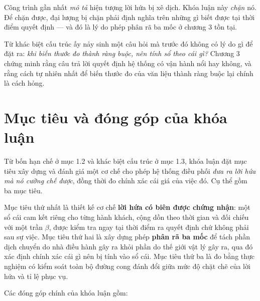\begin{khungy}
Công trình gần nhất \emph{mô tả} hiện tượng lời hứa bị xê dịch. Khóa luận này \emph{chặn} nó.
Để chặn được, đại lượng bị chặn phải định nghĩa trên những gì biết được tại thời điểm quyết
định --- và đó là lý do phép phân rã ba mốc ở chương 3 tồn tại.
\end{khungy}

Từ khác biệt cấu trúc ấy nảy sinh một câu hỏi mà trước đó không có lý do gì để đặt ra:
\emph{khi biến thước đo thành ràng buộc, nên tính sổ theo cái gì?} Chương 3 chứng minh rằng câu
trả lời quyết định hệ thống có vận hành nổi hay không, và rằng cách tự nhiên nhất để biến thước
đo của văn liệu thành ràng buộc lại chính là cách hỏng.

\section{Mục tiêu và đóng góp của khóa luận}

Từ bốn hạn chế ở mục 1.2 và khác biệt cấu trúc ở mục 1.3, khóa luận đặt mục tiêu xây dựng và
đánh giá một cơ chế cho phép hệ thống điều phối \emph{đưa ra lời hứa mà nó cưỡng chế được},
đồng thời đo chính xác cái giá của việc đó. Cụ thể gồm ba mục tiêu.

Mục tiêu thứ nhất là thiết kế cơ chế \textbf{lời hứa có biên được chứng nhận}: một sổ cái cam
kết riêng cho từng hành khách, cộng dồn theo thời gian và đối chiếu với một trần $\beta$, được
kiểm tra ngay tại thời điểm ra quyết định chứ không phải sau sự việc. Mục tiêu thứ hai là xây
dựng phép \textbf{phân rã ba mốc} để tách phần dịch chuyển do nhà điều hành gây ra khỏi phần
do thế giới vật lý gây ra, qua đó xác định chính xác cái gì nên bị tính vào sổ cái. Mục tiêu
thứ ba là đo bằng thực nghiệm có kiểm soát toàn bộ đường cong đánh đổi giữa mức độ chặt chẽ
của lời hứa và tỉ lệ phục vụ.

Các đóng góp chính của khóa luận gồm:

